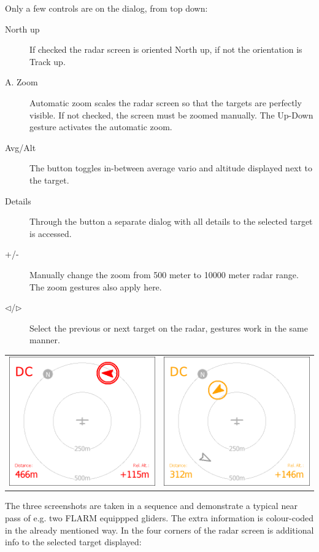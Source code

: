 \documentclass[a4paper,12pt]{refrep}
\begin{document}
Only a few controls are on the dialog, from top down:
\begin{description}
\item[North up]  If checked the radar screen is oriented North up, if not the
orientation is Track up.
\item[A. Zoom]   Automatic zoom scales the radar screen so
that the targets are perfectly visible. If not checked, the screen must be
zoomed manually. The Up-Down gesture activates the automatic zoom. 
\item[Avg/Alt]   The button toggles in-between average
vario and altitude displayed next to the target.
\item[Details]   Through the button a separate dialog with
all details to the selected target is accessed. 
\item[+/-]   Manually change the zoom from 500 meter to
10000 meter radar range. The zoom gestures also apply here.
\item[$\triangleleft$/$\triangleright$]   Select the
previous or next target on the radar, gestures work in the same manner.
\end{description}

\begin{center}
\begin{tabular}{c c}
\includegraphics[angle=0,width=0.5\linewidth,keepaspectratio='true']{figures/cut-flarm2.png}&
\includegraphics[angle=0,width=0.5\linewidth,keepaspectratio='true']{figures/cut-flarm3.png}\\
\end{tabular}
\end{center}
The three screenshots are taken in a sequence and demonstrate a typical near
pass of e.g. two FLARM equippped gliders. The extra information is colour-coded
in the already mentioned way. In the four corners of the radar screen is
additional info to the selected target displayed:
\end{document}
